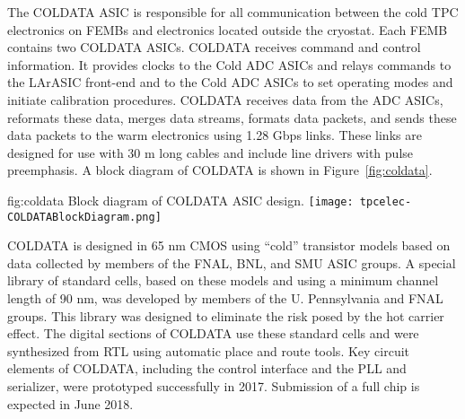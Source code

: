 The COLDATA ASIC is responsible for all communication between the cold TPC electronics on FEMBs and electronics located outside the cryostat.  Each FEMB contains two COLDATA ASICs. COLDATA receives command and control information.  It provides clocks to the Cold ADC ASICs and relays commands to the LArASIC front-end and to the Cold ADC ASICs to set operating modes and initiate calibration procedures.  COLDATA receives data from the ADC ASICs, reformats these data, merges data streams, formats data packets, and sends these data packets to the warm electronics using 1.28 Gbps links.  These links are designed for use with 30 m long cables and include line drivers with pulse preemphasis.  A block diagram of COLDATA is shown in Figure~\ref{fig:coldata}.  

\begin{dunefigure}
{fig:coldata}
{Block diagram of COLDATA ASIC design.}
\texttt{[image: tpcelec-COLDATABlockDiagram.png]}
\end{dunefigure}

COLDATA is designed in 65 nm CMOS using ``cold'' transistor models based on data collected by members of the FNAL, BNL, and SMU ASIC groups.  A special library of standard cells, based on these models and using a minimum channel length of 90 nm, was developed by members of the U. Pennsylvania and FNAL groups.  This library was designed to eliminate the risk posed by the hot carrier effect.  The digital sections of COLDATA use these standard cells and were synthesized from RTL using automatic place and route tools.  Key circuit elements of COLDATA, including the control interface and the PLL and serializer, were prototyped successfully in 2017.  Submission of a full chip is expected in June 2018. 
